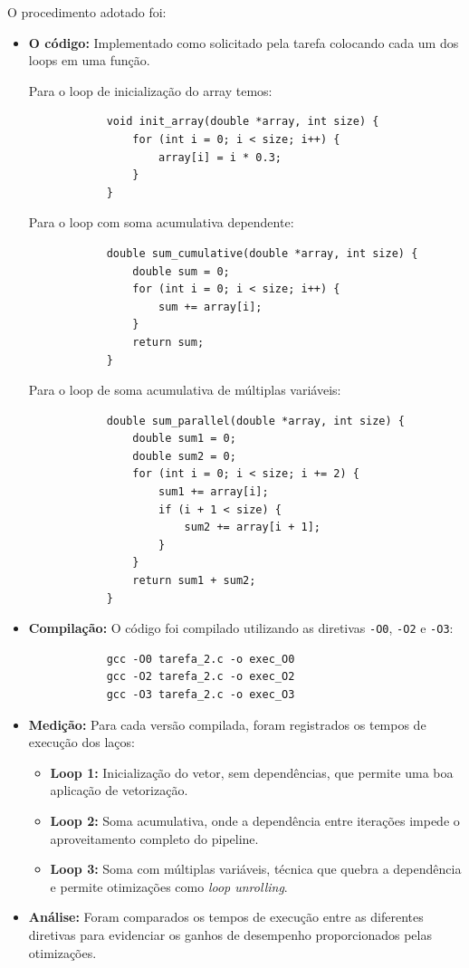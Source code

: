 \documentclass[a4paper, 12pt]{article}
\begin{document}
	O procedimento adotado foi:
	\begin{itemize}
		\item \textbf{O código:} Implementado como solicitado pela tarefa colocando cada um dos loops em uma função. 
		
		Para o loop de inicialização do array temos:
		\begin{verbatim}
			void init_array(double *array, int size) {
				for (int i = 0; i < size; i++) {
					array[i] = i * 0.3;
				}
			}
		\end{verbatim}
		
		Para o loop com soma acumulativa dependente:
		\begin{verbatim}
			double sum_cumulative(double *array, int size) {
				double sum = 0;
				for (int i = 0; i < size; i++) {
					sum += array[i];
				}
				return sum;
			}
		\end{verbatim}
		
		Para o loop de soma acumulativa de múltiplas variáveis:
		\begin{verbatim}
			double sum_parallel(double *array, int size) {
				double sum1 = 0;
				double sum2 = 0;
				for (int i = 0; i < size; i += 2) {
					sum1 += array[i];
					if (i + 1 < size) {
						sum2 += array[i + 1];
					}
				}
				return sum1 + sum2;
			}
		\end{verbatim}
		
		 
		\item \textbf{Compilação:} O código foi compilado utilizando as diretivas \texttt{-O0}, \texttt{-O2} e \texttt{-O3}:
		\begin{verbatim}
			gcc -O0 tarefa_2.c -o exec_O0
			gcc -O2 tarefa_2.c -o exec_O2
			gcc -O3 tarefa_2.c -o exec_O3
		\end{verbatim}
		\item \textbf{Medição:} Para cada versão compilada, foram registrados os tempos de execução dos laços:
		\begin{itemize}
			\item \textbf{Loop 1:} Inicialização do vetor, sem dependências, que permite uma boa aplicação de vetorização.
			\item \textbf{Loop 2:} Soma acumulativa, onde a dependência entre iterações impede o aproveitamento completo do pipeline.
			\item \textbf{Loop 3:} Soma com múltiplas variáveis, técnica que quebra a dependência e permite otimizações como \emph{loop unrolling}.
		\end{itemize}
		\item \textbf{Análise:} Foram comparados os tempos de execução entre as diferentes diretivas para evidenciar os ganhos de desempenho proporcionados pelas otimizações.
	\end{itemize}
	
\end{document}
